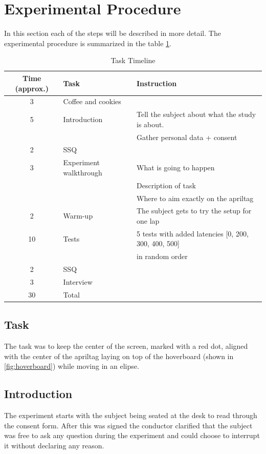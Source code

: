\documentclass[nofilelist]{cslthse-msc}
\begin{document}
\section{Experimental Procedure}
In this section each of the steps will be described in more detail. The experimental procedure is summarized in the table \ref{tab:task-timeline}.

\begin{table}[ht]
   \centering
   \caption{Task Timeline}
   \label{tab:task-timeline}
   \begin{tabular}{|c|l|l|}
   \hline
   \textbf{Time (approx.)} & \textbf{Task} & \textbf{Instruction} \\ \hline
   3 & Coffee and cookies & \\ \hline
   5 & Introduction & Tell the subject about what the study is about. \\
   & & Gather personal data + consent \\ \hline
   2 & SSQ & \\ \hline
   3 & Experiment walkthrough & What is going to happen \\
   & & Description of task \\
   & & Where to aim exactly on the apriltag \\ \hline
   2 & Warm-up & The subject gets to try the setup for one lap \\ \hline
   10 & Tests & 5 tests with added latencies [0, 200, 300, 400, 500] \\ 
   & & in random order \\ \hline
   2 & SSQ & \\ \hline
   3 & Interview & \\ \hline
   30 & Total & \\ \hline
   \end{tabular}
\end{table}

\subsection{Task}
The task was to keep the center of the screen, marked with a red dot, aligned with the center of the apriltag laying on top of the hoverboard (shown in \ref{fig:hoverboard}) while moving in an elipse.

\subsection{Introduction}
The experiment starts with the subject being seated at the desk to read through the consent form. After this was signed the conductor clarified that the subject was free to ask any question during the experiment and could choose to interrupt it without declaring any reason. 
\end{document}
